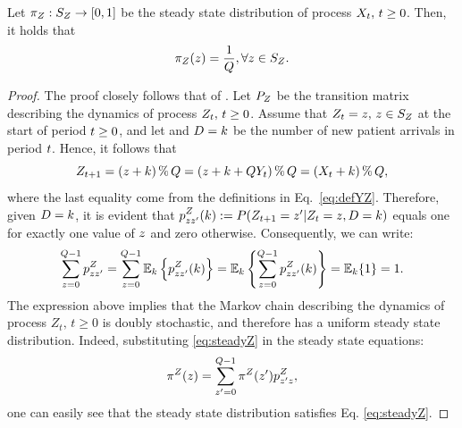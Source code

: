 \begin{prop} \label{prop:steadystate}
Let $\pi_{Z_{}}: S_{Z_{}} \to [0,1]$ be the steady state distribution of process $X_{t}, \, t \ge 0$. Then, it holds that 
%
\begin{equation} \label{eq:steadyZ}
\pi_{Z_{}}(z) = \dfrac{1}{Q}, \forall z \in S_{Z_{}}.
\end{equation}
%
\end{prop}
%
\begin{proof}
The proof closely follows that of \citet[Proposition 5.1]{Axsater2015Inv}. Let $P_{Z_{}}$ be the transition matrix describing the dynamics of process $Z_{t}, \, t \ge 0$. Assume that $Z_{t} = z, \, z \in S_{Z_{}}$ at the start of period $t \ge 0$, and let and $D=k$ be the number of new patient arrivals in period $t$. Hence, it follows that 
%
\[
Z_{t+1} =  (z + k) \,\%\, Q  = (z + k + Q Y_{t}) \,\%\, Q  = (X_{t} + k) \,\%\, Q,
\] 
%
where the last equality come from the definitions in Eq.~\eqref{eq:defYZ}. Therefore, given $D=k$, it is evident that $p_{zz'}^{Z_{}}(k) := P( Z_{t+1} = z' | Z_{t} = z, D=k )$ equals one for exactly one value of $z$ and zero otherwise. Consequently, we can write:
%
\[
\sum_{z=0}^{Q-1} p_{zz'}^{Z_{}} = \sum_{z=0}^{Q-1} \mathbb{E}_{k} \left\{ p_{zz'}^{Z_{}}(k) \right\} = \mathbb{E}_k \left\{  \sum_{z=0}^{Q-1} p_{zz'}^{Z_{}}(k) \right\} = \mathbb{E}_k \{ 1 \} = 1.
\]
%
The expression above  implies that the Markov chain describing the dynamics of process $Z_t, \, t \ge 0$ is doubly stochastic, and therefore has a uniform steady state distribution. Indeed, substituting \eqref{eq:steadyZ} in the steady state equations:
%
\[
\pi_{}^{Z_{}}(z) = \sum_{z'=0}^{Q-1} \pi_{}^{Z_{}}(z') p_{z'z}^{Z_{}},
\]
%
one can easily see that the steady state distribution satisfies Eq. \eqref{eq:steadyZ}.
%
\end{proof}

